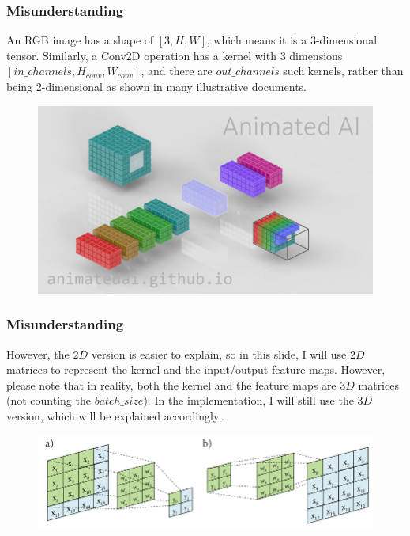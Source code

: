 \documentclass{beamer}
\begin{document}
    \begin{frame}
    	\frametitle{Misunderstanding}
    	\justifying
    	An RGB image has a shape of \([3, H, W]\), which means it is a 3-dimensional tensor. Similarly, a Conv2D operation has a kernel with 3 dimensions \([in\_channels, H_{conv}, W_{conv}]\), and there are \(out\_channels\) such kernels, rather than being 2-dimensional as shown in many illustrative documents.
    	
    	\begin{figure}
    		\centering
    		\includegraphics[width=0.7\linewidth]{src/true_conv}
    	\end{figure}
    \end{frame}
    
    \begin{frame}
    	\frametitle{Misunderstanding}
    	\justifying
    	However, the \(2D\) version is easier to explain, so in this slide, I will use \(2D\) matrices to represent the kernel and the input/output feature maps. However, please note that in reality, both the kernel and the feature maps are \(3D\) matrices (not counting the \(batch\_size\)). In the implementation, I will still use the \(3D\) version, which will be explained accordingly..
    	\begin{figure}
    		\centering
    		\includegraphics[width=0.7\linewidth]{src/conv2d}
    	\end{figure}
    \end{frame}
    
\end{document}
